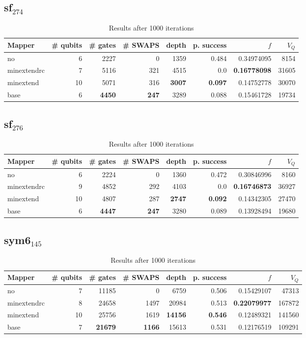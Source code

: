 \documentclass[11pt]{article}
\begin{document}
\subsection{sf\(_{\text{274}}\)}
\label{sec:orgc5d1012}
\begin{table}[H]
\caption{\label{tab:org26ecb34}
Results after 1000 iterations}
\centering
\small
\begin{tabular}{lrrrrrrr}
\hline
Mapper & \# qubits & \# gates & \# SWAPS & depth & p. success & \(f\) & \(V_Q\)\\
\hline
no & 6 & 2227 & 0 & 1359 & 0.484 & 0.34974095 & 8154\\
\hline
minextendrc & 7 & 5116 & 321 & 4515 & 0.0 & \textbf{0.16778098} & 31605\\
minextend & 10 & 5071 & 316 & \textbf{3007} & \textbf{0.097} & 0.14752778 & 30070\\
base & 6 & \textbf{4450} & \textbf{247} & 3289 & 0.088 & 0.15461728 & 19734\\
\hline
\end{tabular}
\end{table}
\subsection{sf\(_{\text{276}}\)}
\label{sec:orgfbe24df}
\begin{table}[H]
\caption{\label{tab:org2bd2c7e}
Results after 1000 iterations}
\centering
\small
\begin{tabular}{lrrrrrrr}
\hline
Mapper & \# qubits & \# gates & \# SWAPS & depth & p. success & \(f\) & \(V_Q\)\\
\hline
no & 6 & 2224 & 0 & 1360 & 0.472 & 0.30846996 & 8160\\
\hline
minextendrc & 9 & 4852 & 292 & 4103 & 0.0 & \textbf{0.16746873} & 36927\\
minextend & 10 & 4807 & 287 & \textbf{2747} & \textbf{0.092} & 0.14342305 & 27470\\
base & 6 & \textbf{4447} & \textbf{247} & 3280 & 0.089 & 0.13928494 & 19680\\
\hline
\end{tabular}
\end{table}
\subsection{sym6\(_{\text{145}}\)}
\label{sec:org398c363}
\begin{table}[H]
\caption{\label{tab:orgdafe0d1}
Results after 1000 iterations}
\centering
\small
\begin{tabular}{lrrrrrrr}
\hline
Mapper & \# qubits & \# gates & \# SWAPS & depth & p. success & \(f\) & \(V_Q\)\\
\hline
no & 7 & 11185 & 0 & 6759 & 0.506 & 0.15429107 & 47313\\
\hline
minextendrc & 8 & 24658 & 1497 & 20984 & 0.513 & \textbf{0.22079977} & 167872\\
minextend & 10 & 25756 & 1619 & \textbf{14156} & \textbf{0.546} & 0.12489321 & 141560\\
base & 7 & \textbf{21679} & \textbf{1166} & 15613 & 0.531 & 0.12176519 & 109291\\
\hline
\end{tabular}
\end{table}
\end{document}
